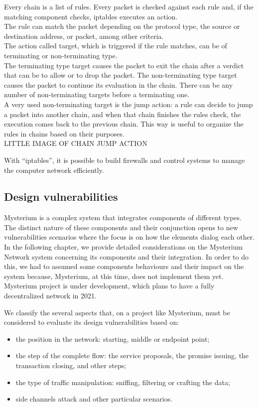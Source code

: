 \documentclass[]{article}
\begin{document}
	Every chain is a list of rules. Every packet is checked against each rule and, if the matching component checks, iptables executes an action.\\
	The rule can match the packet depending on the protocol type, the source or destination address, or packet, among other criteria.\\
	The action called target, which is triggered if the rule matches, can be of terminating or non-terminating type.\\
	The terminating type target causes the packet to exit the chain after a verdict that can be to allow or to drop the packet. The non-terminating type target causes the packet to continue its evaluation in the chain. There can be any number of non-terminating targets before a terminating one.\\
	A very used non-terminating target is the jump action: a rule can decide to jump a packet into another chain, and when that chain finishes the rules check, the execution comes back to the previous chain. This way is useful to organize the rules in chains based on their purposes.\\

	LITTLE IMAGE OF CHAIN JUMP ACTION

	With ``iptables'', it is possible to build firewalls and control systems to manage the computer network efficiently.


	\subsection{Design vulnerabilities}

	Mysterium is a complex system that integrates components of different types. The distinct nature of these components and their conjunction opens to new vulnerabilities scenarios where the focus is on how the elements dialog each other.\\
	In the following chapter, we provide detailed considerations on the Mysterium Network system concerning its components and their integration. In order to do this, we had to assumed some components behaviours and their impact on the system because, Mysterium, at this time, does not implement them yet. Mysterium project is under development, which plans to have a fully decentralized network in 2021. 

	We classify the several aspects that, on a project like Mysterium, must be considered to evaluate its design vulnerabilities based on:
	\begin{itemize}
		\item the position in the network: starting, middle or endpoint point;
		\item the step of the complete flow: the service proposals, the promise issuing, the transaction closing, and other steps;
		\item the type of traffic manipulation: sniffing, filtering or crafting the data;
		\item side channels attack and other particular scenarios.
	\end{itemize}
	
\end{document}
